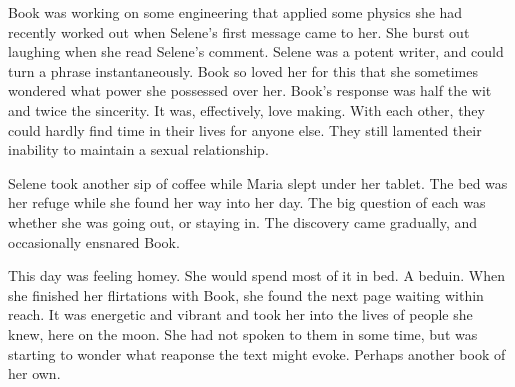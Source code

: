 Book was working on some engineering that applied some physics she had
recently worked out when Selene’s first message came to her.  She
burst out laughing when she read Selene’s comment.  Selene was a
potent writer, and could turn a phrase instantaneously.  Book so loved
her for this that she sometimes wondered what power she possessed over
her.  Book’s response was half the wit and twice the sincerity.  It
was, effectively, love making.  With each other, they could hardly
find time in their lives for anyone else.  They still lamented their
inability to maintain a sexual relationship.

Selene took another sip of coffee while Maria slept under her tablet.
The bed was her refuge while she found her way into her day.  The big
question of each was whether she was going out, or staying in.  The
discovery came gradually, and occasionally ensnared Book.

This day was feeling homey.  She would spend most of it in bed.  A
beduin.  When she finished her flirtations with Book, she found the
next page waiting within reach.  It was energetic and vibrant and took
her into the lives of people she knew, here on the moon.  She had not
spoken to them in some time, but was starting to wonder what reaponse
the text might evoke.  Perhaps another book of her own.

\bye
